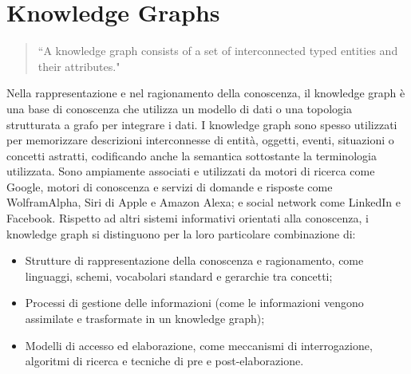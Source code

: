 \section{Knowledge Graphs}
\begin{quote}
    “A knowledge graph consists of a set of
interconnected typed entities and their
attributes."
\end{quote}
Nella rappresentazione e nel ragionamento della conoscenza, il knowledge graph è una base di conoscenza che utilizza un modello di dati o una topologia strutturata a grafo per integrare i dati. I knowledge graph sono spesso utilizzati per memorizzare descrizioni interconnesse di entità, oggetti, eventi, situazioni o concetti astratti, codificando anche la semantica sottostante la terminologia utilizzata. Sono ampiamente associati e utilizzati da motori di ricerca come Google, motori di conoscenza e servizi di domande e risposte come WolframAlpha, Siri di Apple e Amazon Alexa; e social network come LinkedIn e Facebook.
Rispetto ad altri sistemi informativi orientati alla conoscenza, i knowledge graph si distinguono per la loro particolare combinazione di: 
\begin{itemize}
    \item Strutture di rappresentazione della conoscenza e ragionamento, come linguaggi, schemi, vocabolari standard e gerarchie tra concetti; 
    \item Processi di gestione delle informazioni (come le informazioni vengono assimilate e trasformate in un knowledge graph);
    \item Modelli di accesso ed elaborazione, come meccanismi di interrogazione, algoritmi di ricerca e tecniche di pre e post-elaborazione.
\end{itemize}

